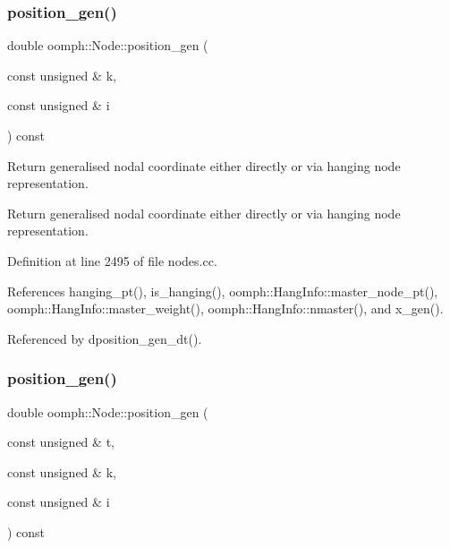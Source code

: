 \subsubsection{\texorpdfstring{position\+\_\+gen()}{position\_gen()}\hspace{0.1cm}{\footnotesize\ttfamily [1/2]}}
{\footnotesize\ttfamily double oomph\+::\+Node\+::position\+\_\+gen (\begin{DoxyParamCaption}\item[{const unsigned \&}]{k,  }\item[{const unsigned \&}]{i }\end{DoxyParamCaption}) const}



Return generalised nodal coordinate either directly or via hanging node representation. 

Return generalised nodal coordinate either directly or via hanging node representation. 

Definition at line 2495 of file nodes.\+cc.



References hanging\+\_\+pt(), is\+\_\+hanging(), oomph\+::\+Hang\+Info\+::master\+\_\+node\+\_\+pt(), oomph\+::\+Hang\+Info\+::master\+\_\+weight(), oomph\+::\+Hang\+Info\+::nmaster(), and x\+\_\+gen().



Referenced by dposition\+\_\+gen\+\_\+dt().

\mbox{\label{classoomph_1_1Node_a56eb5caa6b0cbf91983e1a550de52d9f}} 
\subsubsection{\texorpdfstring{position\+\_\+gen()}{position\_gen()}\hspace{0.1cm}{\footnotesize\ttfamily [2/2]}}
{\footnotesize\ttfamily double oomph\+::\+Node\+::position\+\_\+gen (\begin{DoxyParamCaption}\item[{const unsigned \&}]{t,  }\item[{const unsigned \&}]{k,  }\item[{const unsigned \&}]{i }\end{DoxyParamCaption}) const}



